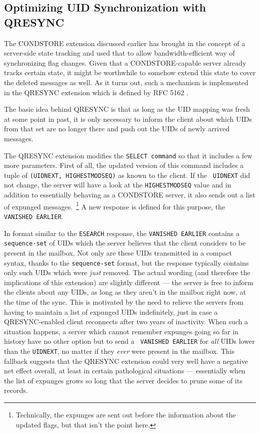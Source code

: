 \documentclass[trojita]{subfiles}
\begin{document}
\subsection{Optimizing UID Synchronization with QRESYNC}
\label{sec:extension-qresync}

The CONDSTORE extension discussed earlier has brought in the concept of a server-side state tracking and used that to
allow bandwidth-efficient way of synchronizing flag changes.  Given that a CONDSTORE-capable server already tracks
certain state, it might be worthwhile to somehow extend this state to cover the deleted messages as well.  As it turns
out, such a mechanism is implemented in the QRESYNC extension which is defined by RFC 5162 \cite{rfc5162}.

The basic idea behind QRESYNC is that as long as the UID mapping was fresh at some point in past, it is only necessary
to inform the client about which UIDs from that set are no longer there and push out the UIDs of newly arrived messages.

The QRESYNC extension modifies the {\tt SELECT command} so that it includes a few more parameters.  First of all, the
updated version of this command includes a tuple of {\tt (UIDNEXT, HIGHESTMODSEQ)} as known to the client.  If the {\tt
UIDNEXT} did not change, the server will have a look at the {\tt HIGHESTMODSEQ} value and in addition to essentially
behaving as a CONDSTORE server, it also sends out a list of expunged messages.~\footnote{Technically, the expunges are
sent out before the information about the updated flags, but that isn't the point here.}  A new response is defined for
this purpose, the {\tt VANISHED EARLIER}.

In format similar to the {\tt ESEARCH} response, the {\tt VANISHED EARLIER} contains a {\tt sequence-set} of UIDs which
the server believes that the client considers to be present in the mailbox.  Not only are these UIDs transmitted in a
compact syntax, thanks to the {\tt sequence-set} format, but the response typically contains only such UIDs which were
{\em just} removed.  The actual wording (and therefore the implications of this extension) are slightly different --- the
server is free to inform the clients about any UIDs, as long as they aren't in the mailbox right now, at the time of the
sync.  This is motivated by the need to relieve the servers from having to maintain a list of expunged UIDs
indefinitely, just in case a QRESYNC-enabled client reconnects after two years of inactivity.  When such a situation
happens, a server which cannot remember expunges going so far in history have no other option but to send a {\tt
VANISHED EARLIER} for {\em all} UIDs lower than the {\tt UIDNEXT}, no matter if they {\em ever} were present in the
mailbox.  This fallback suggests that the QRESYNC extension could very well have a negative net effect overall, at least
in certain pathological situations --- essentially when the list of expunges grows so long that the server decides to
prune some of its records.
\end{document}
